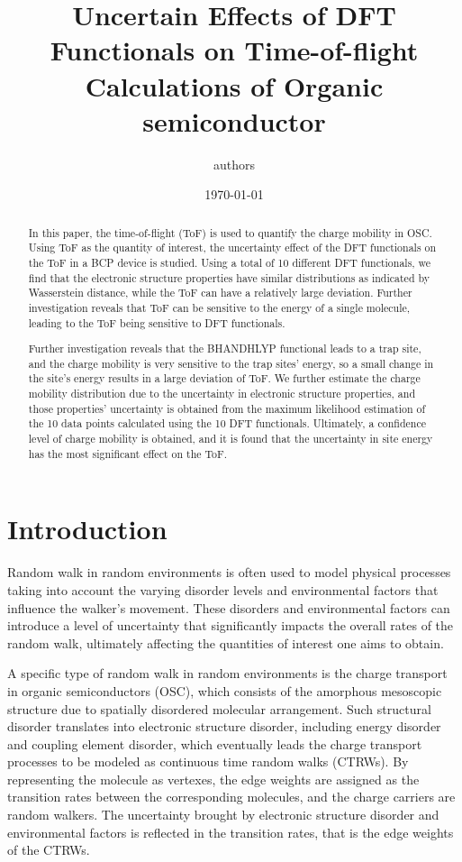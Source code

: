 \documentclass[letterpaper,12pt]{article}
\begin{document}
\linenumbers
\title{Uncertain Effects of DFT Functionals on Time-of-flight Calculations of Organic semiconductor }
\author{authors}
\date{\today}
\maketitle

\begin{abstract}
In this paper, the time-of-flight (ToF) is used to quantify the charge mobility in OSC. 
Using ToF as the quantity of interest, the uncertainty effect of the DFT functionals on the ToF in a BCP device is studied. 
Using a total of 10 different DFT functionals, we find that the electronic structure properties have similar distributions as indicated by Wasserstein distance, while the ToF can have a relatively large deviation.
Further investigation reveals that ToF can be sensitive to the energy of a single molecule, leading to the ToF being sensitive to DFT functionals.

Further investigation reveals that the BHANDHLYP functional leads to a trap site, and the charge mobility is very sensitive to the trap sites' energy, so a small change in the site's energy results in a large deviation of ToF.  
We further estimate the charge mobility distribution due to the uncertainty in electronic structure properties, and those properties' uncertainty is obtained from the maximum likelihood estimation of the 10 data points calculated using the 10 DFT functionals.
Ultimately, a confidence level of charge mobility is obtained, and it is found that the uncertainty in site energy has the most significant effect on the ToF. 
\end{abstract}

\section{Introduction}
Random walk in random environments is often used to model physical processes taking into account the varying disorder levels and environmental factors that influence the walker's movement. 
These disorders and environmental factors can introduce a level of uncertainty that significantly impacts the overall rates of the random walk, ultimately affecting the quantities of interest one aims to obtain.

A specific type of random walk in random environments is the charge transport in organic semiconductors (OSC), which consists of the amorphous mesoscopic structure due to spatially disordered molecular arrangement. 
Such structural disorder translates into electronic structure disorder, including energy disorder and coupling element disorder, which eventually leads the charge transport processes to be modeled as continuous time random walks (CTRWs). By representing the molecule as vertexes, the edge weights are assigned as the transition rates between the corresponding molecules, and the charge carriers are random walkers. 
The uncertainty brought by electronic structure disorder and environmental factors is reflected in the transition rates, that is the edge weights of the CTRWs. 
\end{document}
